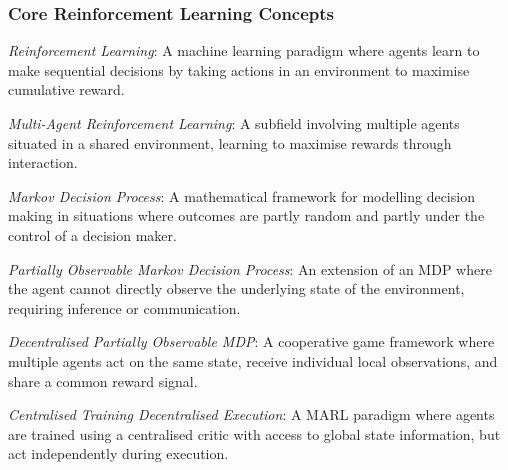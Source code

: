 {\small
\vspace{-10pt}

\subsubsection*{Core Reinforcement Learning Concepts}
\begin{description}[labelwidth=2.5cm, leftmargin=3cm, style=multiline, noitemsep, topsep=0pt]
    \item[RL] \textit{Reinforcement Learning}: A machine learning paradigm where agents learn to make sequential decisions by taking actions in an environment to maximise cumulative reward.
    \item[MARL] \textit{Multi-Agent Reinforcement Learning}: A subfield involving multiple agents situated in a shared environment, learning to maximise rewards through interaction. \cite{Overview, SurveyofMARL}
    \item[MDP] \textit{Markov Decision Process}: A mathematical framework for modelling decision making in situations where outcomes are partly random and partly under the control of a decision maker.
    \item[POMDP] \textit{Partially Observable Markov Decision Process}: An extension of an MDP where the agent cannot directly observe the underlying state of the environment, requiring inference or communication. \cite{POMDP-COM}
    \item[Dec-POMDP] \textit{Decentralised Partially Observable MDP}: A cooperative game framework where multiple agents act on the same state, receive individual local observations, and share a common reward signal. \cite{dec-pomdp}
    \item[CTDE] \textit{Centralised Training Decentralised Execution}: A MARL paradigm where agents are trained using a centralised critic with access to global state information, but act independently during execution.
\end{description}

\vspace{-5pt}
}
